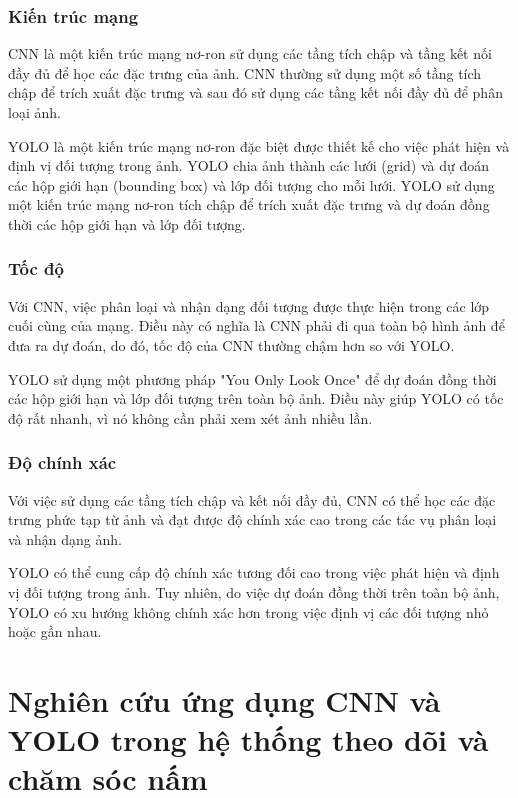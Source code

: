 \subsubsection{Kiến trúc mạng}
CNN là một kiến trúc mạng nơ-ron sử dụng các tầng tích chập và tầng kết nối đầy đủ để học các đặc trưng của ảnh. CNN thường sử dụng một số tầng tích chập để trích xuất đặc trưng và sau đó sử dụng các tầng kết nối đầy đủ để phân loại ảnh.

YOLO là một kiến trúc mạng nơ-ron đặc biệt được thiết kế cho việc phát hiện và định vị đối tượng trong ảnh. YOLO chia ảnh thành các lưới (grid) và dự đoán các hộp giới hạn (bounding box) và lớp đối tượng cho mỗi lưới. YOLO sử dụng một kiến trúc mạng nơ-ron tích chập để trích xuất đặc trưng và dự đoán đồng thời các hộp giới hạn và lớp đối tượng.

\subsubsection{Tốc độ}

Với CNN, việc phân loại và nhận dạng đối tượng được thực hiện trong các lớp cuối cùng của mạng. Điều này có nghĩa là CNN phải đi qua toàn bộ hình ảnh để đưa ra dự đoán, do đó, tốc độ của CNN thường chậm hơn so với YOLO.

YOLO sử dụng một phương pháp "You Only Look Once" để dự đoán đồng thời các hộp giới hạn và lớp đối tượng trên toàn bộ ảnh. Điều này giúp YOLO có tốc độ rất nhanh, vì nó không cần phải xem xét ảnh nhiều lần.

\subsubsection{Độ chính xác}

Với việc sử dụng các tầng tích chập và kết nối đầy đủ, CNN có thể học các đặc trưng phức tạp từ ảnh và đạt được độ chính xác cao trong các tác vụ phân loại và nhận dạng ảnh.

YOLO có thể cung cấp độ chính xác tương đối cao trong việc phát hiện và định vị đối tượng trong ảnh. Tuy nhiên, do việc dự đoán đồng thời trên toàn bộ ảnh, YOLO có xu hướng không chính xác hơn trong việc định vị các đối tượng nhỏ hoặc gần nhau.

\section{Nghiên cứu ứng dụng CNN và YOLO trong hệ thống theo dõi và chăm sóc nấm}

